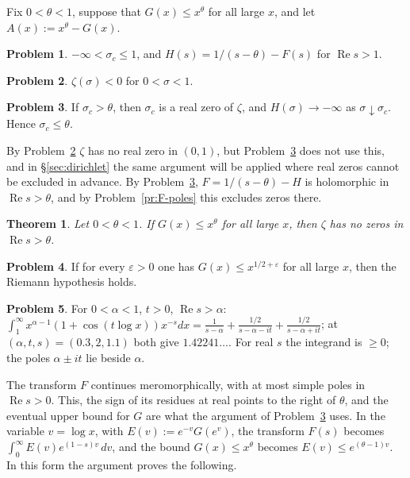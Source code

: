 \documentclass[reqno]{amsart}
\theoremstyle{definition}
\newtheorem{problem}{Problem}[section]
\theoremstyle{plain}
\newtheorem{theorem}{Theorem}[section]
\renewcommand{\Re}{\operatorname{Re}}
\begin{document}
Fix $0 < \theta < 1$, suppose that $G(x) \le x^\theta$ for all large $x$, and let $A(x) := x^\theta - G(x)$.

\begin{problem}\label{pr:H}
$-\infty < \sigma_c \le 1$, and $H(s) = 1/(s - \theta) - F(s)$ for $\Re s > 1$.
\end{problem}

\begin{problem}\label{pr:zeta-negative}
$\zeta(\sigma) < 0$ for $0 < \sigma < 1$.
\end{problem}

\begin{problem}\label{pr:real-zero}
If $\sigma_c > \theta$, then $\sigma_c$ is a real zero of $\zeta$, and $H(\sigma) \to -\infty$ as $\sigma \downarrow \sigma_c$.  Hence $\sigma_c \le \theta$.
\end{problem}

By Problem~\ref{pr:zeta-negative} $\zeta$ has no real zero in $(0,1)$, but Problem~\ref{pr:real-zero} does not use this, and in \S\ref{sec:dirichlet} the same argument will be applied where real zeros cannot be excluded in advance.  By Problem~\ref{pr:real-zero}, $F = 1/(s-\theta) - H$ is holomorphic in $\Re s > \theta$, and by Problem~\ref{pr:F-poles} this excludes zeros there.

\begin{theorem}\label{thm:one-sided}
Let $0 < \theta < 1$.  If $G(x) \le x^\theta$ for all large $x$, then $\zeta$ has no zeros in $\Re s > \theta$.
\end{theorem}

\begin{problem}\label{pr:rh-from}
If for every $\varepsilon > 0$ one has $G(x) \le x^{1/2 + \varepsilon}$ for all large $x$, then the Riemann hypothesis holds.
\end{problem}

\begin{problem}\label{pr:two-poles}
For $0<\alpha<1$, $t>0$, $\Re s>\alpha$: $\int_1^\infty x^{\alpha-1}(1 + \cos(t\log x))x^{-s}dx = \frac1{s-\alpha} + \frac{1/2}{s-\alpha-it} + \frac{1/2}{s-\alpha+it}$; at $(\alpha, t, s) = (0.3, 2, 1.1)$ both give $1.42241\ldots$.  For real $s$ the integrand is $\ge0$; the poles $\alpha \pm it$ lie beside $\alpha$.
\end{problem}

The transform $F$ continues meromorphically, with at most simple poles in $\Re s > 0$.  This, the sign of its residues at real points to the right of $\theta$, and the eventual upper bound for $G$ are what the argument of Problem~\ref{pr:real-zero} uses.  In the variable $v = \log x$, with $E(v) := e^{-v} G(e^v)$, the transform $F(s)$ becomes $\int_0^\infty E(v) e^{(1-s)v} \, d v$, and the bound $G(x) \le x^\theta$ becomes $E(v) \le e^{(\theta - 1)v}$.  In this form the argument proves the following.
\end{document}
